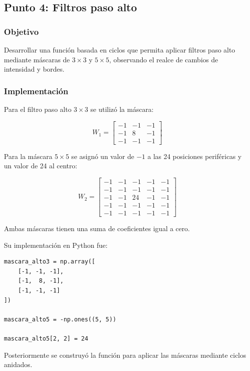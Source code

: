 \documentclass[11pt,letterpaper]{article}
\begin{document}
\subsection{Punto 4: Filtros paso alto}

\subsubsection*{Objetivo}

Desarrollar una función basada en ciclos
que permita aplicar filtros paso alto
mediante máscaras de $3\times3$
y $5\times5$, observando el realce
de cambios de intensidad y bordes.

\subsubsection*{Implementación}

Para el filtro paso alto $3\times3$
se utilizó la máscara:

\[
W_1=
\begin{bmatrix}
-1&-1&-1\\
-1&8&-1\\
-1&-1&-1
\end{bmatrix}
\]

Para la máscara $5\times5$ se asignó
un valor de $-1$ a las 24 posiciones
periféricas y un valor de 24 al centro:

\[
W_2=
\begin{bmatrix}
-1&-1&-1&-1&-1\\
-1&-1&-1&-1&-1\\
-1&-1&24&-1&-1\\
-1&-1&-1&-1&-1\\
-1&-1&-1&-1&-1
\end{bmatrix}
\]

Ambas máscaras tienen una suma
de coeficientes igual a cero.

Su implementación en Python fue:

\begin{lstlisting}
mascara_alto3 = np.array([
    [-1, -1, -1],
    [-1,  8, -1],
    [-1, -1, -1]
])

mascara_alto5 = -np.ones((5, 5))

mascara_alto5[2, 2] = 24
\end{lstlisting}

Posteriormente se construyó
la función para aplicar las máscaras
mediante ciclos anidados.
\end{document}
